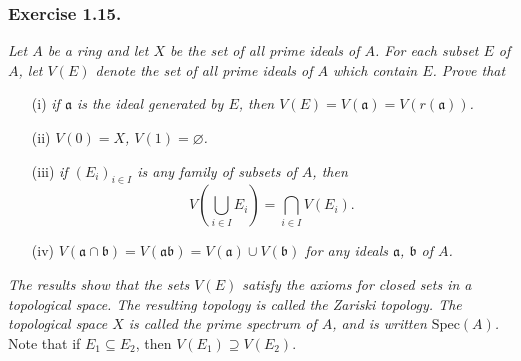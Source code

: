 \documentclass{article}
\begin{document}
\subsubsection*{Exercise 1.15.}
\emph{Let $A$ be a ring and let $X$ be the set of all prime ideals of $A$.
For each subset $E$ of $A$,
let $V(E)$ denote the set of all prime ideals of $A$ which contain $E$.
Prove that}
\begin{enumerate}
\item[(i)]
  \emph{if $\mathfrak{a}$ is the ideal generated by $E$,
  then $V(E) = V(\mathfrak{a}) = V(r(\mathfrak{a}))$.}

\item[(ii)]
  \emph{$V(0) = X$, $V(1) = \varnothing$.}

\item[(iii)]
  \emph{if $(E_i)_{i \in I}$ is any family of subsets of $A$,
  then
  $$V\left( \bigcup_{i \in I}E_i \right) = \bigcap_{i \in I} V(E_i).$$}

\item[(iv)]
  \emph{$V(\mathfrak{a} \cap \mathfrak{b})
  = V(\mathfrak{a} \mathfrak{b})
  = V(\mathfrak{a}) \cup V(\mathfrak{b})$
  for any ideals $\mathfrak{a}$, $\mathfrak{b}$ of $A$.}
\end{enumerate}


\emph{The results show that the sets $V(E)$ satisfy
the axioms for closed sets in a topological space.
The resulting topology is called the Zariski topology.
The topological space $X$ is called the prime spectrum of $A$,
and is written $\mathrm{Spec}(A)$.} \\



Note that if $E_1 \subseteq E_2$,
then $V(E_1) \supseteq V(E_2)$. \\
\end{document}
